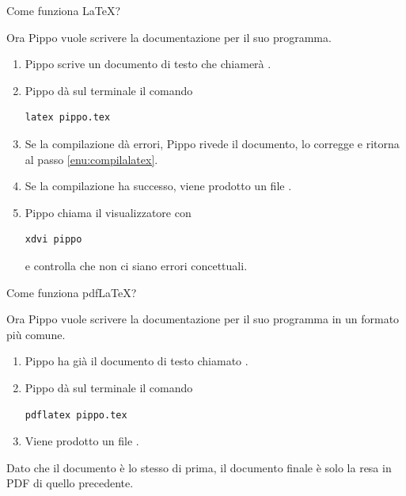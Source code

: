 \documentclass{beamer}
\begin{document}
\begin{frame}[fragile]{Come funziona \LaTeX?}

Ora Pippo vuole scrivere la documentazione per il suo programma.
\bigskip
\begin{enumerate}
\item Pippo scrive un documento di testo che chiamer\`a .
\item \label{enu:compilalatex}Pippo d\`a sul terminale il comando

\begin{verbatim}
latex pippo.tex
\end{verbatim}

\item Se la compilazione d\`a errori, Pippo rivede il documento, lo corregge
e ritorna al passo \ref{enu:compilalatex}.
\item Se la compilazione ha successo, viene prodotto un file .
\item Pippo chiama il visualizzatore con

\begin{verbatim}
xdvi pippo
\end{verbatim}

e controlla che non ci siano errori concettuali.
\end{enumerate}
\end{frame}

\begin{frame}[fragile]{Come funziona pdf\LaTeX?}

Ora Pippo vuole scrivere la documentazione per il suo programma in
un formato pi\`u comune.
\bigskip
\begin{enumerate}
\item Pippo ha gi\`a il documento di testo chiamato .
\item Pippo d\`a sul terminale il comando
\begin{verbatim}
pdflatex pippo.tex
\end{verbatim}
\item Viene prodotto un file .
\end{enumerate}
\bigskip
Dato che il documento  \`e lo stesso di prima,
il documento finale \`e solo la resa in PDF di quello precedente.
\end{frame}
\end{document}
